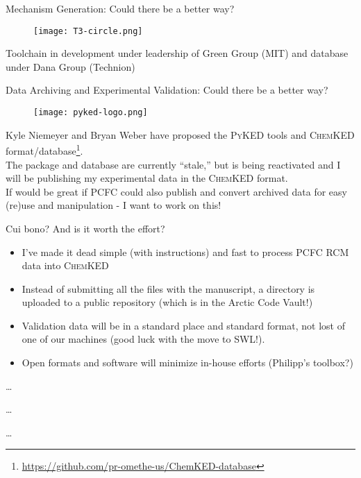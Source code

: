 \documentclass[10pt,presentation]{beamer}
\begin{document}
\begin{frame}{Mechanism Generation: Could there be a better way?}
\begin{figure}
	\centering
	\texttt{[image: T3-circle.png]}
\end{figure}
Toolchain in development under leadership of Green Group (MIT) and database under Dana Group (Technion)
\end{frame}       
%
\begin{frame}{Data Archiving and Experimental Validation: Could there be a better way?}
	\begin{multicols}{2}
	\begin{figure}
		\centering
		\texttt{[image: pyked-logo.png]}
	\end{figure}
	\columnbreak
Kyle Niemeyer and Bryan Weber have proposed the \textsc{PyKED} tools and \textsc{ChemKED} format/database\footnote{\url{https://github.com/pr-omethe-us/ChemKED-database}}.\\
\vspace{0.3cm}
The package and database are currently ``stale,'' but is being reactivated and I will be publishing my experimental data in the \textsc{ChemKED} format.\\
\vspace{0.3cm}
If would be great if PCFC could also publish and convert archived data for easy (re)use and manipulation - I want to work on this!
	\end{multicols}
\end{frame} 

\begin{frame}{Cui bono? And is it worth the effort?}
	\vspace{-0.6cm}
\begin{multicols}{2}
	\begin{itemize}
		\item I've made it dead simple (with instructions) and fast to process PCFC RCM data into \textsc{ChemKED}
		\item Instead of submitting all the files with the manuscript, a directory is uploaded to a public repository (which is in the Arctic Code Vault!)
		\item Validation data will be in a standard place and standard format, not lost of one of our machines (good luck with the move to SWL!).
		\item Open formats and software will minimize in-house efforts (Philipp's toolbox?)
	\end{itemize}
\columnbreak
{\tiny
	\ldots

	\ldots

	\ldots}
\end{multicols}
\end{frame}
\end{document}
